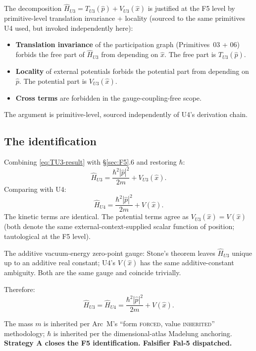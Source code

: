 \documentclass[11pt,a4paper]{article}
\begin{document}
The decomposition $\hat{H}_{U3} = T_{U3}(\hat{p}) + V_{U3}(\hat{x})$ is justified at the F5 level by primitive-level translation invariance + locality (sourced to the same primitives U4 used, but invoked independently here):

\begin{itemize}
  \item \textbf{Translation invariance} of the participation graph (Primitives~03 + 06) forbids the free part of $\hat{H}_{U3}$ from depending on $\hat{x}$. The free part is $T_{U3}(\hat{p})$.
  \item \textbf{Locality} of external potentials forbids the potential part from depending on $\hat{p}$. The potential part is $V_{U3}(\hat{x})$.
  \item \textbf{Cross terms} are forbidden in the gauge-coupling-free scope.
\end{itemize}

The argument is primitive-level, sourced independently of U4's derivation chain.

\subsection{The identification}

Combining \eqref{eq:TU3-result} with \S\ref{sec:F5}.6 and restoring $\hbar$:
\begin{equation}
\hat{H}_{U3} = \frac{\hbar^2 |\hat{p}|^2}{2m} + V_{U3}(\hat{x}). \label{eq:HU3-form}
\end{equation}
Comparing with U4:
\begin{equation}
\hat{H}_{U4} = \frac{\hbar^2 |\hat{p}|^2}{2m} + V(\hat{x}). \label{eq:HU4-form}
\end{equation}
The kinetic terms are identical. The potential terms agree as $V_{U3}(\hat{x}) = V(\hat{x})$ (both denote the same external-context-supplied scalar function of position; tautological at the F5 level).

The additive vacuum-energy zero-point gauge: Stone's theorem leaves $\hat{H}_{U3}$ unique up to an additive real constant; U4's $V(\hat{x})$ has the same additive-constant ambiguity. Both are the same gauge and coincide trivially.

Therefore:
\begin{equation}
\boxed{\hat{H}_{U3} = \hat{H}_{U4} = \frac{\hbar^2 |\hat{p}|^2}{2m} + V(\hat{x}).} \label{eq:HU3-HU4}
\end{equation}

The mass $m$ is inherited per Arc~M's ``form \textsc{forced}, value \textsc{inherited}'' methodology; $\hbar$ is inherited per the dimensional-atlas Madelung anchoring. \textbf{Strategy A closes the F5 identification. Falsifier Fal-5 dispatched.}
\end{document}
